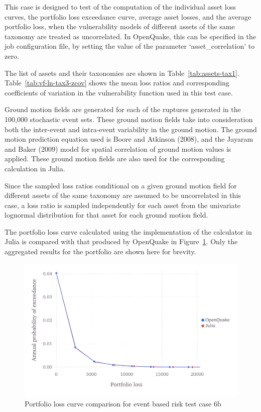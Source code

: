 This case is designed to test of the computation of the individual asset loss curves, the portfolio loss exceedance curve, average asset losses, and the average portfolio loss, when the vulnerability models of different assets of the same taxonomy are treated as uncorrelated. In OpenQuake, this can be specified in the job configuration file, by setting the value of the parameter `asset\_correlation' to zero.

The list of assets and their taxonomies are shown in Table~\ref{tab:assets-tax1}. Table~\ref{tab:vf-ln-tax3-zcov} shows the mean loss ratios and corresponding coefficients of variation in the vulnerability function used in this test case.

Ground motion fields are generated for each of the ruptures generated in the 100,000 stochastic event sets. These ground motion fields take into consideration both the inter-event and intra-event variability in the ground motion. The ground motion prediction equation used is Boore and Atkinson (2008), and the Jayaram and Baker (2009) model for spatial correlation of ground motion values is applied. These ground motion fields are also used for the corresponding calculation in Julia.

Since the sampled loss ratios conditional on a given ground motion field for different assets of the same taxonomy are assumed to be uncorrelated in this case, a loss ratio is sampled independently for each asset from the univariate lognormal distribution for that asset for each ground motion field.

The portfolio loss curve calculated using the implementation of the calculator in Julia is compared with that produced by OpenQuake in Figure~\ref{fig:lc-ebr-6b}. Only the aggregated results for the portfolio are shown here for brevity.

\begin{figure}[htbp]
\centering
\includegraphics[width=12cm]{qareport/figures/fig-lc-ebr-6b}
\caption{Portfolio loss curve comparison for event based risk test case 6b}
\label{fig:lc-ebr-6b}
\end{figure}